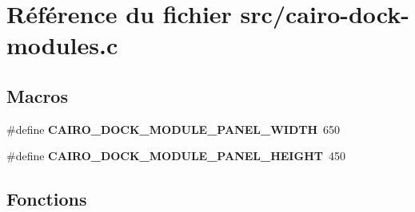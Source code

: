 \section{R\'{e}f\'{e}rence du fichier src/cairo-dock-modules.c}
\label{cairo-dock-modules_8c}
\subsection*{Macros}
\begin{CompactItemize}
\item 
\#define {\bf CAIRO\_\-DOCK\_\-MODULE\_\-PANEL\_\-WIDTH}~650
\item 
\#define {\bf CAIRO\_\-DOCK\_\-MODULE\_\-PANEL\_\-HEIGHT}~450
\end{CompactItemize}
\subsection*{Fonctions}
